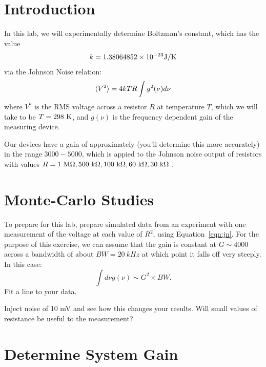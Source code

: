 \documentclass[12pt]{article}
\begin{document}
\section{Introduction}

In this lab, we will experimentally determine Boltzman's constant, which has the value
\begin{equation*}
k = 1.38064852 \times 10^{-23} {\rm J}/{\rm K}
\end{equation*}
via the Johnson Noise relation:
\begin{equation} \label{eqn:jn}
\braket{V^2} = 4 kT R \int g^2(\nu) d\nu
\end{equation}
where $V^2$ is the RMS voltage across a resistor $R$ at temperature $T$, which we will take to be $T=298~{\rm K}$, and $g(\nu)$ is the frequency dependent gain of the measuring device.

Our devices have a gain of approximately (you'll determine this more accurately) in the range $3000-5000$, which is appied to the Johnson noise output of resistors with values $R=1~{\rm M\Omega}, 500~{\rm k\Omega}, 100~{\rm k\Omega}, 60~{\rm k\Omega}, 30~{\rm k\Omega}$ .

\section{Monte-Carlo Studies}

To prepare for this lab, prepare simulated data from an experiment with one measurement of the voltage at each value of $R^2$, using Equation~\ref{eqn:jn}.  For the purpose of this exercise, we can assume that the gain is constant at $G\sim4000$ across a bandwidth of about $BW = 20~kHz$ at which point it falls off very steeply.  In this case:
\begin{displaymath}
\int d\nu g(\nu) \sim G^2 \times BW.
\end{displaymath}
Fit a line to your data.

Inject noise of 10 mV and see how this changes your results.  Will small values of resistance be useful to the measurement?

\section{Determine System Gain}
\end{document}
